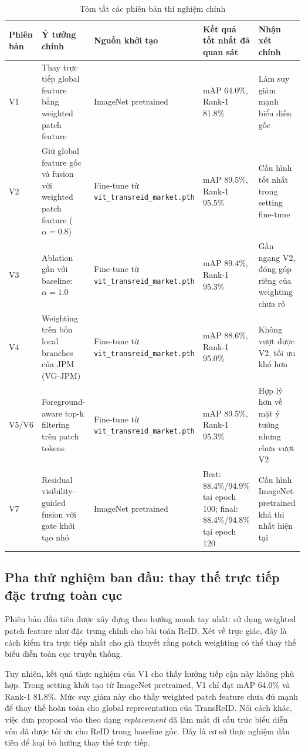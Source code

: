 \begin{table}[!t]
    \centering
    \begin{tabular}{p{1.1cm} p{4.5cm} p{3.9cm} p{3.4cm} p{3.5cm}}
        \hline
        Phiên bản & Ý tưởng chính & Nguồn khởi tạo & Kết quả tốt nhất đã quan sát & Nhận xét chính \\
        \hline
        V1 & Thay trực tiếp global feature bằng weighted patch feature & ImageNet pretrained & mAP 64.0\%, Rank-1 81.8\% & Làm suy giảm mạnh biểu diễn gốc \\
        V2 & Giữ global feature gốc và fusion với weighted patch feature (\(\alpha = 0.8\)) & Fine-tune từ \texttt{vit\_transreid\_market.pth} & mAP 89.5\%, Rank-1 95.5\% & Cấu hình tốt nhất trong setting fine-tune \\
        V3 & Ablation gần với baseline: \(\alpha = 1.0\) & Fine-tune từ \texttt{vit\_transreid\_market.pth} & mAP 89.4\%, Rank-1 95.3\% & Gần ngang V2, đóng góp riêng của weighting chưa rõ \\
        V4 & Weighting trên bốn local branches của JPM (VG-JPM) & Fine-tune từ \texttt{vit\_transreid\_market.pth} & mAP 88.6\%, Rank-1 95.0\% & Không vượt được V2, tối ưu khó hơn \\
        V5/V6 & Foreground-aware top-k filtering trên patch tokens & Fine-tune từ \texttt{vit\_transreid\_market.pth} & mAP 89.5\%, Rank-1 95.3\% & Hợp lý hơn về mặt ý tưởng nhưng chưa vượt V2 \\
        V7 & Residual visibility-guided fusion với gate khởi tạo nhỏ & ImageNet pretrained & Best: 88.4\%/94.9\% tại epoch 100; final: 88.4\%/94.8\% tại epoch 120 & Cấu hình ImageNet-pretrained khả thi nhất hiện tại \\
        \hline
    \end{tabular}
    \caption{Tóm tắt các phiên bản thí nghiệm chính}
    \label{tab:experiment_timeline}
\end{table}

\subsection{Pha thử nghiệm ban đầu: thay thế trực tiếp đặc trưng toàn cục}

Phiên bản đầu tiên được xây dựng theo hướng mạnh tay nhất: sử dụng weighted patch feature như đặc trưng chính cho bài toán ReID. Xét về trực giác, đây là cách kiểm tra trực tiếp nhất cho giả thuyết rằng patch weighting có thể thay thế biểu diễn toàn cục truyền thống.

Tuy nhiên, kết quả thực nghiệm của V1 cho thấy hướng tiếp cận này không phù hợp. Trong setting khởi tạo từ ImageNet pretrained, V1 chỉ đạt mAP 64.0\% và Rank-1 81.8\%. Mức suy giảm này cho thấy weighted patch feature chưa đủ mạnh để thay thế hoàn toàn cho global representation của TransReID. Nói cách khác, việc đưa proposal vào theo dạng \textit{replacement} đã làm mất đi cấu trúc biểu diễn vốn đã được tối ưu cho ReID trong baseline gốc. Đây là cơ sở thực nghiệm đầu tiên để loại bỏ hướng thay thế trực tiếp.

